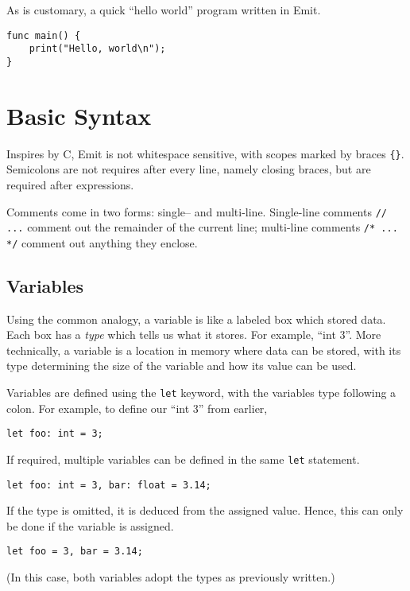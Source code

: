 \documentclass{article}
\begin{document}
    As is customary, a quick ``hello world'' program written in Emit.

    \begin{lstlisting}[language=CustomLang]
func main() {
    print("Hello, world\n");
}
    \end{lstlisting}

    \section{Basic Syntax}\label{sec:basic-syntax}

    Inspires by C, Emit is not whitespace sensitive, with scopes marked by braces \texttt{\{\}}.
    Semicolons are not requires after every line, namely closing braces, but are required after expressions.

    Comments come in two forms: single-- and multi-line.
    Single-line comments \texttt{// ...} comment out the remainder of the current line;
    multi-line comments \texttt{/* ... */} comment out anything they enclose.

    \subsection{Variables}\label{subsec:variables-&-assignment}

    Using the common analogy, a variable is like a labeled box which stored data.
    Each box has a \textit{type} which tells us what it stores.
    For example, ``int 3''.
    More technically, a variable is a location in memory where data can be stored, with its type determining the size of the variable and how its value can be used.

    Variables are defined using the \texttt{let} keyword, with the variables type following a colon.
    For example, to define our ``int 3'' from earlier,
    \begin{lstlisting}[language=CustomLang]
let foo: int = 3;
    \end{lstlisting}

    If required, multiple variables can be defined in the same \texttt{let} statement.
    \begin{lstlisting}[language=CustomLang]
let foo: int = 3, bar: float = 3.14;
    \end{lstlisting}

    If the type is omitted, it is deduced from the assigned value.
    Hence, this can only be done if the variable is assigned.
    \begin{lstlisting}[language=CustomLang]
let foo = 3, bar = 3.14;
    \end{lstlisting}
    (In this case, both variables adopt the types as previously written.)
\end{document}
